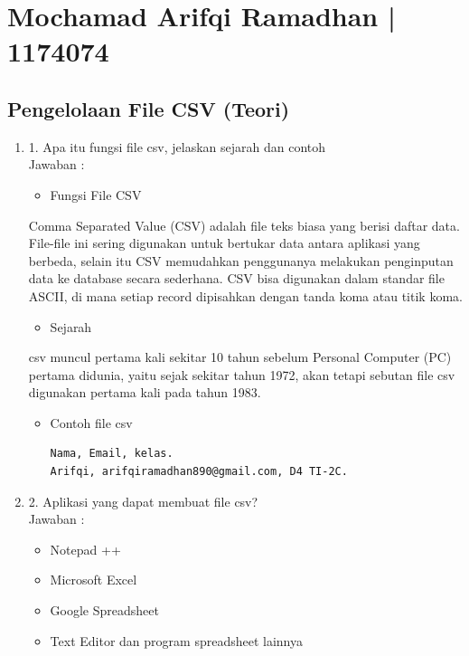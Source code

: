 \section{Mochamad Arifqi Ramadhan | 1174074}
\subsection{Pengelolaan File CSV (Teori)}
\begin{enumerate}

\item 1. Apa itu fungsi file csv, jelaskan sejarah dan contoh\\
Jawaban :

\begin{itemize}
\item Fungsi File CSV
\end{itemize}

Comma Separated Value (CSV) adalah file teks biasa yang berisi daftar data. File-file ini sering digunakan untuk bertukar data antara aplikasi yang berbeda, selain itu CSV memudahkan penggunanya melakukan penginputan data ke database secara sederhana. CSV bisa digunakan dalam standar file ASCII, di mana setiap record dipisahkan dengan tanda koma atau titik koma.

\begin{itemize}
\item Sejarah 
\end{itemize}

csv muncul pertama kali sekitar 10 tahun sebelum Personal Computer (PC)  pertama didunia, yaitu sejak sekitar tahun 1972, akan tetapi sebutan file csv digunakan pertama kali pada tahun 1983.

\begin{itemize}
\item Contoh file csv
\begin{verbatim}
Nama, Email, kelas.
Arifqi, arifqiramadhan890@gmail.com, D4 TI-2C.
\end{verbatim}
\end{itemize}

\item 2.  Aplikasi yang dapat membuat file csv?\\
Jawaban :

\begin{itemize}
\item Notepad ++
\item Microsoft Excel
\item  Google Spreadsheet
\item Text Editor dan program spreadsheet  lainnya
\end{itemize}


\end{enumerate}
